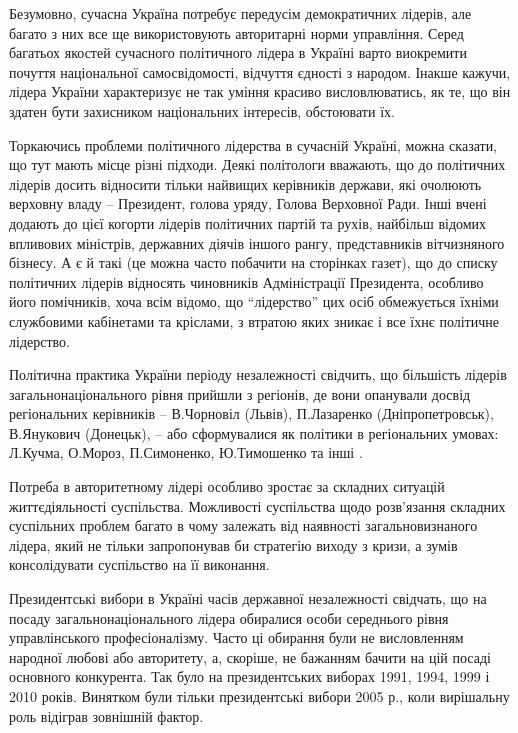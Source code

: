 Безумовно, сучасна Україна потребує передусім демократичних лідерів, але багато з них все ще використовують авторитарні норми управління. Серед багатьох якостей сучасного політичного лідера в Україні варто виокремити почуття національної самосвідомості, відчуття єдності з народом. Інакше кажучи, лідера України характеризує не так уміння красиво висловлюватись, як те, що він здатен бути захисником національних інтересів, обстоювати їх.

Торкаючись проблеми політичного лідерства в сучасній Україні, можна сказати, що тут мають місце різні підходи. Деякі політологи вважають, що до політичних лідерів досить відносити тільки найвищих керівників держави, які очолюють верховну владу – Президент, голова уряду, Голова Верховної Ради. Інші вчені додають до цієї когорти лідерів політичних партій та рухів, найбільш відомих впливових міністрів, державних діячів іншого рангу, представників вітчизняного бізнесу. А є й такі (це можна часто побачити на сторінках газет), що до списку політичних лідерів відносять чиновників Адміністрації Президента, особливо його помічників, хоча всім відомо, що “лідерство” цих осіб обмежується їхніми службовими кабінетами та кріслами, з втратою яких зникає і все їхнє політичне лідерство.

Політична практика України періоду незалежності свідчить, що більшість лідерів загальнонаціонального рівня прийшли з регіонів, де вони опанували досвід регіональних керівників – В.Чорновіл (Львів), П.Лазаренко (Дніпропетровськ), В.Янукович (Донецьк), – або сформувалися як політики в регіональних умовах: Л.Кучма, О.Мороз, П.Симоненко, Ю.Тимошенко та інші .

Потреба в авторитетному лідері особливо зростає за складних ситуацій життєдіяльності суспільства. Можливості суспільства щодо розв’язання складних суспільних проблем багато в чому залежать від наявності загальновизнаного лідера, який не тільки запропонував би стратегію виходу з кризи, а зумів консолідувати суспільство на її виконання.

Президентські вибори в Україні часів державної незалежності свідчать, що на посаду загальнонаціонального лідера обиралися особи середнього рівня управлінського професіоналізму. Часто ці обирання були не висловленням народної любові або авторитету, а, скоріше, не бажанням бачити на цій посаді основного конкурента. Так було на президентських виборах 1991, 1994, 1999 і 2010 років. Винятком були тільки президентські вибори 2005 р., коли вирішальну роль відіграв зовнішній фактор.


